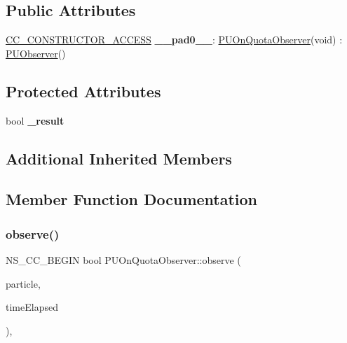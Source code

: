 \subsection*{Public Attributes}
\begin{DoxyCompactItemize}
\item 
\mbox{\label{classPUOnQuotaObserver_aca6ca20ac4981562902c9d56ee126a77}} 
\hyperlink{_2cocos2d_2cocos_2base_2ccConfig_8h_a25ef1314f97c35a2ed3d029b0ead6da0}{C\+C\+\_\+\+C\+O\+N\+S\+T\+R\+U\+C\+T\+O\+R\+\_\+\+A\+C\+C\+E\+SS} {\bfseries \+\_\+\+\_\+pad0\+\_\+\+\_\+}\+: \hyperlink{classPUOnQuotaObserver}{P\+U\+On\+Quota\+Observer}(void) \+: \hyperlink{classPUObserver}{P\+U\+Observer}()
\end{DoxyCompactItemize}
\subsection*{Protected Attributes}
\begin{DoxyCompactItemize}
\item 
\mbox{\label{classPUOnQuotaObserver_a19e08284d6f2469a8c5d3ecf4e658fe9}} 
bool {\bfseries \+\_\+result}
\end{DoxyCompactItemize}
\subsection*{Additional Inherited Members}


\subsection{Member Function Documentation}
\mbox{\label{classPUOnQuotaObserver_a0126f46b5e421c15218697814c5922ff}} 
\subsubsection{\texorpdfstring{observe()}{observe()}\hspace{0.1cm}{\footnotesize\ttfamily [1/2]}}
{\footnotesize\ttfamily N\+S\+\_\+\+C\+C\+\_\+\+B\+E\+G\+IN bool P\+U\+On\+Quota\+Observer\+::observe (\begin{DoxyParamCaption}\item[{\hyperlink{structPUParticle3D}{P\+U\+Particle3D} $\ast$}]{particle,  }\item[{float}]{time\+Elapsed }\end{DoxyParamCaption})\hspace{0.3cm}{\ttfamily [override]}, {\ttfamily [virtual]}}







